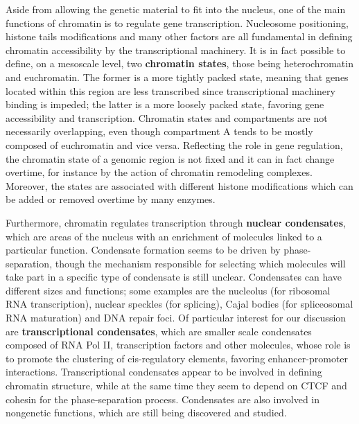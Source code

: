 Aside from allowing the genetic material to fit into the nucleus, one of the main functions of chromatin is to regulate gene transcription. Nucleosome positioning, histone tails modifications and many other factors are all fundamental in defining chromatin accessibility by the transcriptional machinery\cite{chromatinfiber2015, histonemodification2007}. It is in fact possible to define, on a mesoscale level, two \textbf{chromatin states}, those being heterochromatin and euchromatin. The former is a more tightly packed state, meaning that genes located within this region are less transcribed since transcriptional machinery binding is impeded; the latter is a more loosely packed state, favoring gene accessibility and transcription\cite{heterochromatin2020}. Chromatin states and compartments are not necessarily overlapping, even though compartment A tends to be mostly composed of euchromatin and vice versa. Reflecting the role in gene regulation, the chromatin state of a genomic region is not fixed and it can in fact change overtime, for instance by the action of chromatin remodeling complexes\cite{chromatinremodeling2021}. Moreover, the states are associated with different histone modifications which can be added or removed overtime by many enzymes\cite{histonemodifications2020, epigeneticbook2020}.

Furthermore, chromatin regulates transcription through \textbf{nuclear condensates}, which are areas of the nucleus with an enrichment of molecules linked to a particular function\cite{condensates2023}. Condensate formation seems to be driven by phase-separation, though the mechanism responsible for selecting which molecules will take part in a specific type of condensate is still unclear\cite{phaseseparation2022}. Condensates can have different sizes and functions; some examples are the nucleolus (for ribosomal RNA transcription), nuclear speckles (for splicing), Cajal bodies (for spliceosomal RNA maturation) and DNA repair foci\cite{condensatetypes2020}. Of particular interest for our discussion are \textbf{transcriptional condensates}, which are smaller scale condensates composed of RNA Pol II, transcription factors and other molecules, whose role is to promote the clustering of cis-regulatory elements, favoring enhancer-promoter interactions\cite{condensatecomposition2018, condensateenhancer2018}. Transcriptional condensates appear to be involved in defining chromatin structure, while at the same time they seem to depend on CTCF and cohesin for the phase-separation process\cite{condensatectcf2022, condensatecohesin2021}. Condensates are also involved in nongenetic functions, which are still being discovered and studied\cite{condensates2023}.

